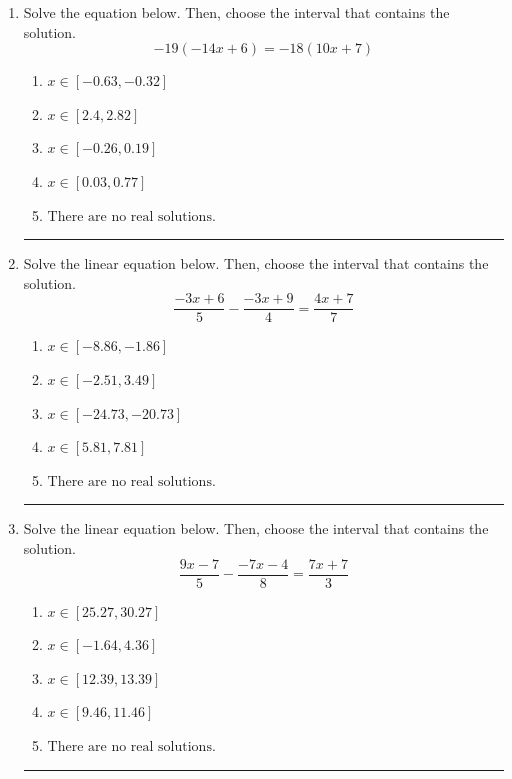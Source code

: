 \documentclass[14pt]{extbook}
\newcommand{\litem}[1]{\item#1\hspace*{-1cm}\rule{\textwidth}{0.4pt}}
\begin{document}
\begin{enumerate}
{\begin{enumerate}[label=\Alph*.]
\end{enumerate} }
\litem{
Solve the equation below. Then, choose the interval that contains the solution.\[ -19(-14x + 6) = -18(10x + 7) \]\begin{enumerate}[label=\Alph*.]
\item \( x \in [-0.63, -0.32] \)
\item \( x \in [2.4, 2.82] \)
\item \( x \in [-0.26, 0.19] \)
\item \( x \in [0.03, 0.77] \)
\item \( \text{There are no real solutions.} \)

\end{enumerate} }
\litem{
Solve the linear equation below. Then, choose the interval that contains the solution.\[ \frac{-3x + 6}{5} - \frac{-3x + 9}{4} = \frac{4x + 7}{7} \]\begin{enumerate}[label=\Alph*.]
\item \( x \in [-8.86, -1.86] \)
\item \( x \in [-2.51, 3.49] \)
\item \( x \in [-24.73, -20.73] \)
\item \( x \in [5.81, 7.81] \)
\item \( \text{There are no real solutions.} \)

\end{enumerate} }
\litem{
Solve the linear equation below. Then, choose the interval that contains the solution.\[ \frac{9x -7}{5} - \frac{-7x -4}{8} = \frac{7x + 7}{3} \]\begin{enumerate}[label=\Alph*.]
\item \( x \in [25.27, 30.27] \)
\item \( x \in [-1.64, 4.36] \)
\item \( x \in [12.39, 13.39] \)
\item \( x \in [9.46, 11.46] \)
\item \( \text{There are no real solutions.} \)


\end{enumerate}}
\end{enumerate}
\end{document}
